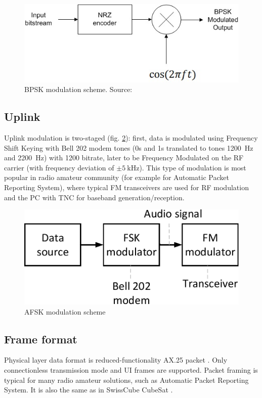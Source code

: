 \begin{figure}[H]
    \centering
    \includegraphics[width=0.7\paperwidth]{img/5/bpsk_modulator.jpg}
    \caption{BPSK modulation scheme. Source: \cite{bpsk_modulator}}
    \label{bpsk_modulator}
\end{figure}


\subsection{Uplink}
Uplink modulation is two-staged (fig. \ref{afsk_modulator}): first, data is modulated using Frequency Shift Keying with Bell 202 modem tones (0s and 1s translated to tones \SI{1200}{\hertz} and \SI{2200}{\hertz}) with \SI{1200}{\bps} bitrate, later to be Frequency Modulated on the RF carrier (with frequency deviation of $\pm\SI{5}{\kilo\hertz}$). This type of modulation is most popular in radio amateur community (for example for Automatic Packet Reporting System), where typical FM transceivers are used for RF modulation and the PC with TNC for baseband generation/reception. 

\begin{figure}[H]
    \centering
    \includegraphics[width=0.7\paperwidth]{img/5/afsk_modulator.pdf}
    \caption{AFSK modulation scheme}
    \label{afsk_modulator}
\end{figure}

\subsection{Frame format}
Physical layer data format is reduced-functionality AX.25 packet \cite{AX25_standard}. Only connectionless transmission mode and UI frames are supported. Packet framing is typical for many radio amateur solutions, such as Automatic Packet Reporting System. It is also the same as in SwissCube CubeSat \cite{SwissCube_AX25}.

